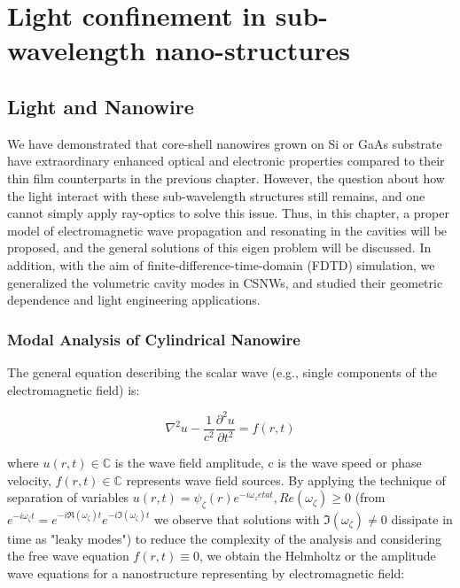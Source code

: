 \chapter[Light Confinement]{Light confinement in sub-wavelength nano-structures} \label{LM}


\section{Light and Nanowire} \label{LightNW}

We have demonstrated that core-shell nanowires grown on Si or GaAs substrate
have extraordinary enhanced optical and electronic properties compared to their
thin film counterparts in the previous chapter. However, the question about how
the light interact with these sub-wavelength structures still remains, and one
cannot simply apply ray-optics to solve this issue. Thus, in this chapter, a
proper model of electromagnetic wave propagation and resonating in the
cavities will be proposed, and the general solutions of this eigen problem will
be discussed. In addition, with the aim of finite-difference-time-domain (FDTD)
simulation, we generalized the volumetric cavity modes in CSNWs, and studied
their geometric dependence and light engineering applications.

\subsection{Modal Analysis of Cylindrical Nanowire}

The general equation describing the scalar wave (e.g., single components of the
electromagnetic field) is:

\begin{equation}
  {\nabla}^2u-\frac{1}{c^2}\frac{{\partial}^2u}{\partial{t}^2}=f(r,t)
\end{equation}

where $u(r,t)\in\mathbb{C}$ is the wave field amplitude, c is the wave speed or
phase velocity, $f(r,t)\in\mathbb{C}$ represents wave field sources. By
applying the technique of separation of variables
$u(r,t)=\psi_\zeta(r)e^{-i\omega_zeta{t}}, Re(\omega_\zeta)\geq0$ (from
$e^{-i\omega_\zeta{t}}=e^{-i\Re(\omega_\zeta)t}e^{-i\Im(\omega_\zeta)t}$ we
observe that solutions with $\Im(\omega_\zeta)\neq0$ dissipate in time as
"leaky modes") to reduce the complexity of the analysis and considering the
free wave equation $f(r,t)\equiv{0}$, we obtain the Helmholtz or the amplitude
wave equations for a nanostructure representing by electromagnetic field:

